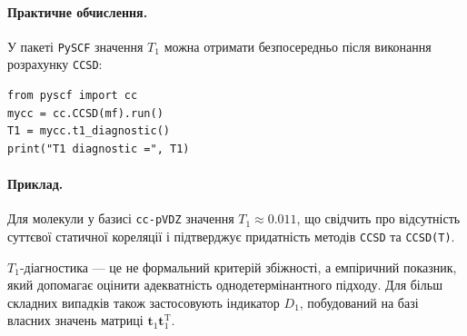 \paragraph{Практичне обчислення.}
У пакеті \texttt{PySCF} значення \(T_1\) можна отримати
безпосередньо після виконання розрахунку \texttt{CCSD}:
\begin{verbatim}
from pyscf import cc
mycc = cc.CCSD(mf).run()
T1 = mycc.t1_diagnostic()
print("T1 diagnostic =", T1)
\end{verbatim}

\paragraph{Приклад.}
Для молекули  у базисі \texttt{cc-pVDZ} значення \(T_1 \approx 0.011\),
що свідчить про відсутність суттєвої статичної кореляції
і підтверджує придатність методів \texttt{CCSD} та \texttt{CCSD(T)}.

\begin{remark}
$T_1$-діагностика --- це не формальний критерій збіжності,
а емпіричний показник, який допомагає оцінити
адекватність однодетермінантного підходу.
Для більш складних випадків також застосовують
індикатор $D_1$, побудований на базі власних значень
матриці \( \mathbf{t}_1 \mathbf{t}_1^\mathrm{T} \).
\end{remark}

